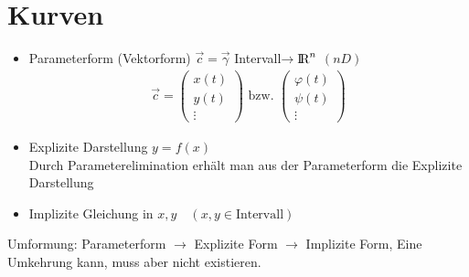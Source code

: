 \section{Kurven}
\begin{itemize}
\item Parameterform (Vektorform) $\vec{c}=\vec{\gamma}$ Intervall$\rightarrow\text{\rmfamily I\!R}^n$ $(nD)$
\begin{align*}
	\vec{c}=\begin{pmatrix}x(t) \\y(t)\\\vdots\end{pmatrix} \text{ bzw. } \begin{pmatrix}\varphi(t) \\\psi(t)\\\vdots\end{pmatrix}
\end{align*}
\item Explizite Darstellung $y=f(x)$ \\
	Durch Parameterelimination erhält man aus der Parameterform die Explizite Darstellung
\item Implizite Gleichung in $x,y\quad (x,y\in \text{Intervall})$
\end{itemize}
Umformung: Parameterform $\rightarrow$ Explizite Form $\rightarrow$ Implizite Form, Eine Umkehrung kann, muss aber nicht existieren. 